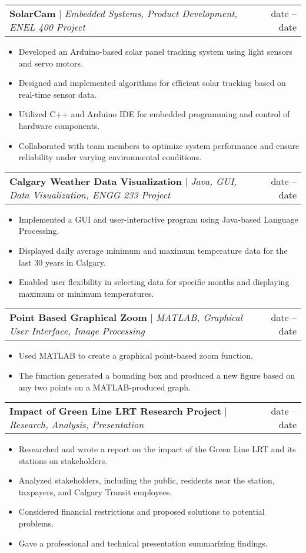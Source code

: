 \documentclass[A4,10pt]{article}
\makeatletter
\newcommand{\resumeItem}[1]{
  \item\small{
    {#1 \vspace{-2pt}}
  }
}
\newcommand{\resumeProjectHeading}[2]{
    \item
    \begin{tabular*}{0.97\textwidth}{l@{\extracolsep{\fill}}r}
      \small#1 & #2 \\
    \end{tabular*}\vspace{-7pt}
}
\newcommand{\resumeItemListStart}{\begin{itemize}}
\newcommand{\resumeItemListEnd}{\end{itemize}\vspace{-5pt}}
\makeatother
\begin{document}
        \resumeProjectHeading
        {\textbf{SolarCam} $|$ \emph{Embedded Systems, Product Development, ENEL 400 Project}}{date -- date}
        \resumeItemListStart
          \resumeItem{Developed an Arduino-based solar panel tracking system using light sensors and servo motors.}
          \resumeItem{Designed and implemented algorithms for efficient solar tracking based on real-time sensor data.}
          \resumeItem{Utilized C++ and Arduino IDE for embedded programming and control of hardware components.}
          \resumeItem{Collaborated with team members to optimize system performance and ensure reliability under varying environmental conditions.}
        \resumeItemListEnd
  
        \resumeProjectHeading
        {\textbf{Calgary Weather Data Visualization} $|$ \emph{Java, GUI, Data Visualization, ENGG 233 Project}}{date -- date}
        \resumeItemListStart
          \resumeItem{Implemented a GUI and user-interactive program using Java-based Language Processing.}
          \resumeItem{Displayed daily average minimum and maximum temperature data for the last 30 years in Calgary.}
          \resumeItem{Enabled user flexibility in selecting data for specific months and displaying maximum or minimum temperatures.}
        \resumeItemListEnd
  
        \resumeProjectHeading
        {\textbf{Point Based Graphical Zoom} $|$ \emph{MATLAB, Graphical User Interface, Image Processing}}{date -- date}
        \resumeItemListStart
          \resumeItem{Used MATLAB to create a graphical point-based zoom function.}
          \resumeItem{The function generated a bounding box and produced a new figure based on any two points on a MATLAB-produced graph.}
        \resumeItemListEnd
  
        \resumeProjectHeading
        {\textbf{Impact of Green Line LRT Research Project} $|$ \emph{Research, Analysis, Presentation}}{date -- date}
        \resumeItemListStart
          \resumeItem{Researched and wrote a report on the impact of the Green Line LRT and its stations on stakeholders.}
          \resumeItem{Analyzed stakeholders, including the public, residents near the station, taxpayers, and Calgary Transit employees.}
          \resumeItem{Considered financial restrictions and proposed solutions to potential problems.}
          \resumeItem{Gave a professional and technical presentation summarizing findings.}
        \resumeItemListEnd
  
\end{document}
